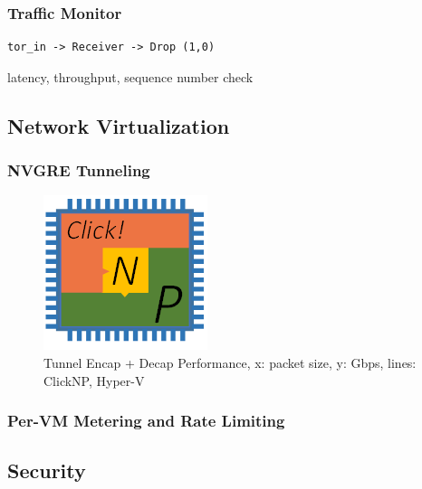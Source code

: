 {\subsubsection{Traffic Monitor}

\begin{lstlisting}
tor_in -> Receiver -> Drop (1,0)
\end{lstlisting}

latency, throughput, sequence number check

\subsection{Network Virtualization}

\subsubsection{NVGRE Tunneling}

\begin{figure}[h!]
	\centering
	\includegraphics[width=0.6\columnwidth]{image/logo}
	\vspace{-0.15in}
	\caption{Tunnel Encap + Decap Performance, x: packet size, y: Gbps, lines: ClickNP, Hyper-V}
	\vspace{-0.15in}
	\label{fig:NVGREPerformance}
\end{figure}

\subsubsection{Per-VM Metering and Rate Limiting}

\subsection{Security}

}
